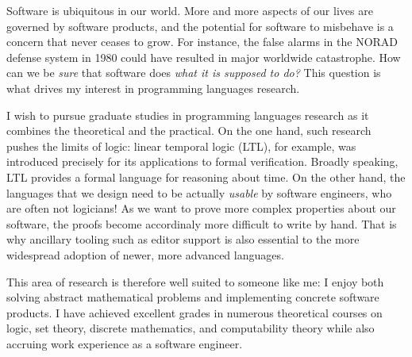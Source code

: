 \documentclass[11pt,letterpaper]{article}
\begin{document}
Software is ubiquitous in our world. More and more aspects of our lives are
governed by software products, and the potential for software to misbehave is a
concern that never ceases to grow.
For instance, the false alarms in the NORAD defense system in 1980 could have
resulted in major worldwide catastrophe.
How can we be \emph{sure} that software does \emph{what it is supposed to do?}
This question is what drives my interest in programming languages research.

I wish to pursue graduate studies in programming languages research as it
combines the theoretical and the practical.
On the one hand, such research pushes the limits of logic: linear temporal
logic\footnotemark{} (LTL), for example, was introduced precisely for its
applications to formal verification.
Broadly speaking, LTL provides a formal language for reasoning about time.
%
%
%
On the other hand, the languages that we design need to
be actually \emph{usable} by software engineers, who are often not logicians!
As we want to prove more complex properties about our software, the proofs
become accordinaly more difficult to write by hand.
That is why ancillary tooling such as editor support is also essential to the
more widespread adoption of newer, more advanced languages.

This area of research is therefore well suited to someone like me: I enjoy
both solving abstract mathematical problems and implementing concrete software
products.
I have achieved excellent grades in numerous theoretical courses on logic, set
theory, discrete mathematics, and computability theory while also accruing work
experience as a software engineer.
\end{document}
